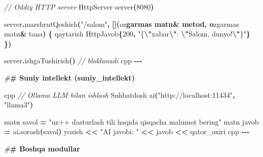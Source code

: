 \documentclass[a4paper,11pt,twoside,openright]{book}
\newenvironment{Shaded}{\begin{snugshade}}{\end{snugshade}}
\newcommand{\CharTok}[1]{\textcolor[rgb]{0.31,0.60,0.02}{#1}}
\newcommand{\CommentTok}[1]{\textcolor[rgb]{0.56,0.35,0.01}{\textit{#1}}}
\newcommand{\DecValTok}[1]{\textcolor[rgb]{0.00,0.00,0.81}{#1}}
\newcommand{\ErrorTok}[1]{\textcolor[rgb]{0.64,0.00,0.00}{\textbf{#1}}}
\newcommand{\NormalTok}[1]{#1}
\newcommand{\OperatorTok}[1]{\textcolor[rgb]{0.81,0.36,0.00}{\textbf{#1}}}
\newcommand{\PreprocessorTok}[1]{\textcolor[rgb]{0.56,0.35,0.01}{\textit{#1}}}
\newcommand{\SpecialCharTok}[1]{\textcolor[rgb]{0.81,0.36,0.00}{\textbf{#1}}}
\newcommand{\StringTok}[1]{\textcolor[rgb]{0.31,0.60,0.02}{#1}}
\begin{document}
\begin{Shaded}
\begin{Highlighting}[]
\CommentTok{// Oddiy HTTP server}
\NormalTok{HttpServer server}\OperatorTok{(}\DecValTok{8080}\OperatorTok{)}

\NormalTok{server}\OperatorTok{.}\NormalTok{marshrutQoshish}\OperatorTok{(}\StringTok{"/salom"}\OperatorTok{,} \OperatorTok{[](}\NormalTok{o}\CharTok{\textquotesingle{}z}\ErrorTok{garmas matn\& metod, o}\CharTok{\textquotesingle{}}\NormalTok{zgarmas matn}\OperatorTok{\&}\NormalTok{ tana}\OperatorTok{)} \OperatorTok{\{}
\NormalTok{    qaytarish HttpJavob}\OperatorTok{\{}\DecValTok{200}\OperatorTok{,} \StringTok{"\{}\SpecialCharTok{\textbackslash{}"}\StringTok{xabar}\SpecialCharTok{\textbackslash{}"}\StringTok{: }\SpecialCharTok{\textbackslash{}"}\StringTok{Salom, dunyo!}\SpecialCharTok{\textbackslash{}"}\StringTok{\}"}\OperatorTok{\}}
\OperatorTok{\})}

\NormalTok{server}\OperatorTok{.}\NormalTok{ishgaTushirish}\OperatorTok{()}   \CommentTok{// bloklanadi}
\ErrorTok{\textasciigrave{}\textasciigrave{}\textasciigrave{}}\NormalTok{cpp}
\OperatorTok{{-}{-}{-}}

\PreprocessorTok{\#}\ErrorTok{\# Sun\textquotesingle{}iy intellekt (\textasciigrave{}suniy\_intellekt\textasciigrave{})}

\ErrorTok{\textasciigrave{}\textasciigrave{}\textasciigrave{}}\NormalTok{cpp}
\CommentTok{// Ollama LLM bilan ishlash}
\NormalTok{Suhbatdosh ai}\OperatorTok{(}\StringTok{"http://localhost:11434"}\OperatorTok{,} \StringTok{"llama3"}\OperatorTok{)}

\NormalTok{matn savol }\OperatorTok{=} \StringTok{"uz++ dasturlash tili haqida qisqacha ma\textquotesingle{}lumot bering"}
\NormalTok{matn javob }\OperatorTok{=}\NormalTok{ ai}\OperatorTok{.}\NormalTok{sorash}\OperatorTok{(}\NormalTok{savol}\OperatorTok{)}
\NormalTok{yozish }\OperatorTok{\textless{}\textless{}} \StringTok{"AI javobi: "} \OperatorTok{\textless{}\textless{}}\NormalTok{ javob }\OperatorTok{\textless{}\textless{}}\NormalTok{ qator\_oxiri}
\ErrorTok{\textasciigrave{}\textasciigrave{}\textasciigrave{}}\NormalTok{cpp}
\OperatorTok{{-}{-}{-}}

\PreprocessorTok{\#}\ErrorTok{\# Boshqa modullar}


\end{Highlighting}
\end{Shaded}
\end{document}
